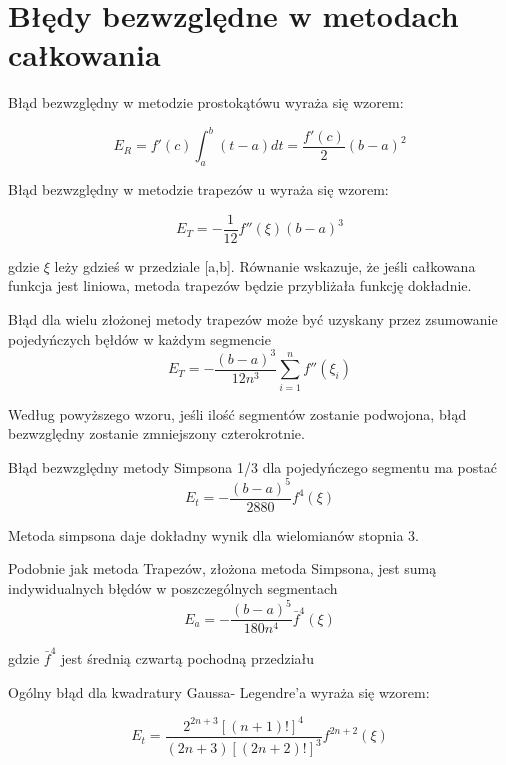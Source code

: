 \documentclass[12pt,twoside]{article}
\begin{document}
\section{Błędy bezwzględne w metodach całkowania}

Błąd bezwzględny w metodzie prostokątówu wyraża się wzorem:

\begin{equation}
E_R = f'(c)\int_a^b(t-a)dt = \frac{f'(c)}{2}(b-a)^2
\label{Eq:rectError}
\end{equation}

Błąd bezwzględny w metodzie trapezów u wyraża się wzorem:

\begin{equation}
E_T = -\frac{1}{12}f''(\xi)(b-a)^3
\label{Eq:rownanie}
\end{equation}

gdzie $\xi$ leży gdzieś w przedziale [a,b]. Równanie wskazuje, że jeśli całkowana funkcja jest liniowa, metoda trapezów będzie przybliżała funkcję dokładnie.

Błąd dla wielu złożonej metody trapezów może być uzyskany przez zsumowanie pojedyńczych bęłdów w każdym segmencie
\begin{equation}
E_T = -\frac{(b-a)^3}{12n^3}\sum_{i=1}^n f''(\xi_i)
\label{Eq:rownanie}
\end{equation}

Według powyższego wzoru, jeśli ilość segmentów zostanie podwojona, błąd bezwzględny zostanie zmniejszony czterokrotnie.

Błąd bezwzględny metody Simpsona 1/3 dla pojedyńczego segmentu ma postać
\begin{equation}
E_t = -\frac{(b-a)^5}{2880}f^{4}(\xi)
\label{Eq:rownanie}
\end{equation}

Metoda simpsona daje dokładny wynik dla wielomianów stopnia 3.

Podobnie jak metoda Trapezów,  złożona metoda Simpsona, jest sumą indywidualnych błędów w poszczególnych segmentach
\begin{equation}
E_a = -\frac{(b-a)^5}{180n^4}\bar{f}^{4}(\xi)
\label{Eq:rownanie}
\end{equation}

gdzie $\bar{f}^{4}$ jest średnią czwartą pochodną przedziału

Ogólny błąd dla kwadratury Gaussa- Legendre'a wyraża się wzorem:

\begin{equation}
E_t = \frac{2^{2n+3}[(n+1)!]^4}{(2n+3)[(2n+2)!]^3}f^{2n+2}(\xi)
\label{Eq:rownanie}
\end{equation}
\end{document}
